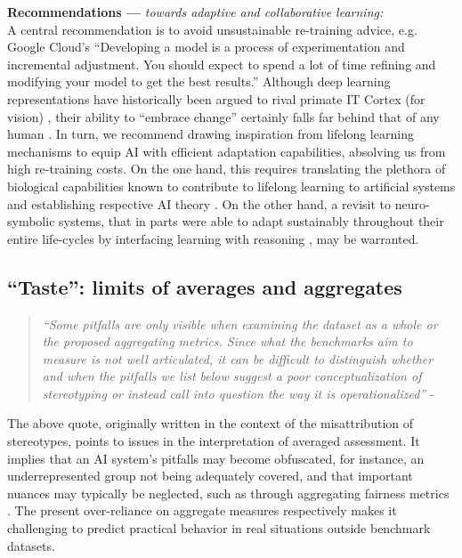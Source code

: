 \documentclass[manuscript,screen,authorversion,nonacm]{acmart}
\begin{document}
\noindent \textbf{Recommendations ---} \textit{towards adaptive and collaborative learning:} \\
A central recommendation is to avoid unsustainable re-training advice, e.g. Google Cloud's \cite{GoogleCloud2021Workflow} ``Developing a model is a process of experimentation and incremental adjustment. You should expect to spend a lot of time refining and modifying your model to get the best results.'' Although deep learning representations have historically been argued to rival primate IT Cortex (for vision) \cite{Cadieu2014DLCortex}, their ability to ``embrace change'' \cite{Hadsell2020EmbracingChange} certainly falls far behind that of any human \cite{Flesch2018continualmindmachine, Chen2018Lifelong}. In turn, we recommend drawing inspiration from lifelong learning mechanisms to equip AI with efficient adaptation capabilities, absolving us from high re-training costs. On the one hand, this requires translating the plethora of biological capabilities known to contribute to lifelong learning to artificial systems \cite{kudithipudi2022biolifelong} and establishing respective AI theory \cite{Prado2022ContinualTheory}. On the other hand, a revisit to neuro-symbolic systems, that in parts were able to adapt sustainably throughout their entire life-cycles by interfacing learning with reasoning \cite{Carlson2010NELL,Chen2013NEIL,Mitchell2015neverending}, may be warranted. 


\subsection{``Taste'': limits of averages and aggregates}

\begin{quote}
    \emph{``Some pitfalls are only visible when examining the dataset as a whole or the proposed aggregating metrics. Since what the benchmarks aim to measure is not well articulated, it can be difficult to distinguish whether and when the pitfalls we list below suggest a poor conceptualization of stereotyping or instead call into question the way it is operationalized''} - \citet{Blodgett2021StereotypingSalmon}
\end{quote}

\noindent The above quote, originally written in the context of the misattribution of stereotypes, points to issues in the interpretation of averaged assessment. It implies that an AI system's pitfalls may become obfuscated, for instance, an underrepresented group not being adequately covered, and that important nuances may typically be neglected, such as through aggregating fairness metrics \cite{Castelnovo2022FairenssNuances}. The present over-reliance on aggregate measures \cite{Burnell2023RethinkReporting} respectively makes it challenging to predict practical behavior in real situations outside benchmark datasets.
\end{document}

